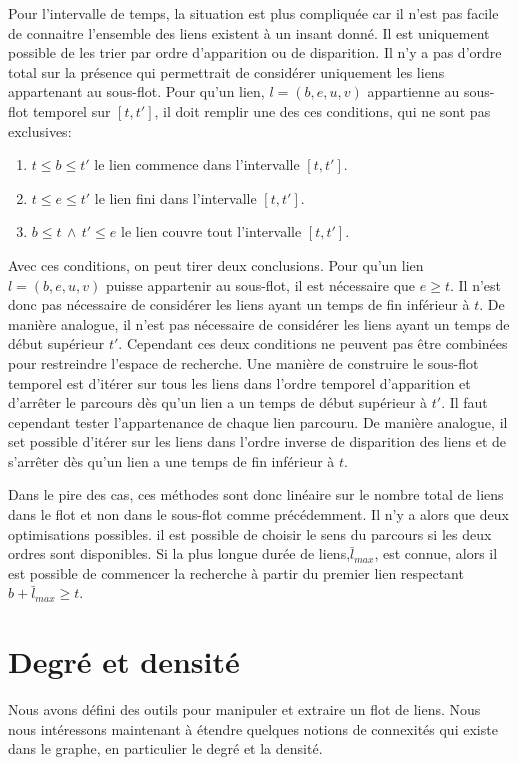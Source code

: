 Pour l'intervalle de temps, la situation est plus compliquée car il n'est pas facile de connaitre l'ensemble des liens existent à un insant donné.
Il est uniquement possible de les trier par ordre d'apparition ou de disparition.
Il n'y a pas d'ordre total sur la présence qui permettrait de considérer uniquement les liens appartenant au sous-flot.
Pour qu'un lien, $l= (b,e,u,v)$ appartienne au sous-flot temporel sur $[t,t']$, il doit remplir une des ces conditions, qui ne sont pas exclusives:
\begin{enumerate}
\item $t \leq b \leq t'$ le lien commence dans l'intervalle $[t,t']$.
\item $t \leq e \leq t'$ le lien fini dans l'intervalle $[t,t']$.
\item $ b \leq t \, \wedge \, t' \leq e$ le lien couvre tout l'intervalle $[t,t']$.
\end{enumerate}

Avec ces conditions, on peut tirer deux conclusions.
Pour qu'un lien $l=(b,e,u,v)$ puisse appartenir au sous-flot, il est nécessaire que $e \geq t$.
Il n'est donc pas nécessaire de considérer les liens ayant un temps de fin inférieur à $t$.
De manière analogue, il n'est pas nécessaire de considérer les liens ayant un temps de début supérieur $t'$.
Cependant ces deux conditions ne peuvent pas être combinées pour restreindre l'espace de recherche.
Une manière de construire le sous-flot temporel est d'itérer sur tous les liens dans l'ordre temporel d'apparition et d'arrêter le parcours dès qu'un lien a un temps de début supérieur à $t'$.
Il faut cependant tester l'appartenance de chaque lien parcouru.
De manière analogue, il set possible d'itérer sur les liens dans l'ordre inverse de disparition des liens et de s'arrêter dès qu'un lien a une temps de fin inférieur à $t$.


Dans le pire des cas, ces méthodes sont donc linéaire sur le nombre total de liens dans le flot et non dans le sous-flot comme précédemment.
Il n'y a alors que deux optimisations possibles.
il est possible de choisir le sens du parcours si les deux ordres sont disponibles.
Si la plus longue durée de liens,$\bar{l}_{max}$, est connue, alors il est possible de commencer la recherche à partir du premier lien respectant $b+\bar{l}_{max} \geq t$.



\section{Degré et densité}
\label{sec:def_densite}
Nous avons défini des outils pour manipuler et extraire un flot de liens.
Nous nous intéressons maintenant à étendre quelques notions de connexités qui existe dans le graphe, en particulier le degré et la densité.


